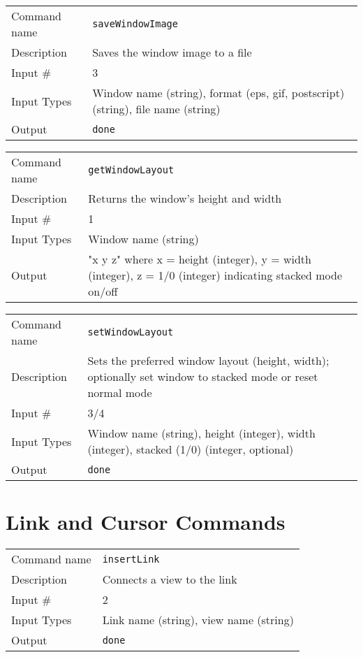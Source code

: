 \bigskip

\noindent
\begin{tabular}{l|p{5in}}
\hline
Command name & {\tt saveWindowImage} \\
Description  & Saves the window image to a file \\
Input \#     & 3 \\
Input Types  & Window name (string), format (eps, gif, postscript) (string),
               file name (string) \\
Output       & {\tt done} \\
\hline
\end{tabular}

\bigskip

\noindent
\begin{tabular}{l|p{5in}}
\hline
Command name & {\tt getWindowLayout} \\
Description  & Returns the window's height and width \\
Input \#     & 1 \\
Input Types  & Window name (string) \\
Output       & "x y z" where x = height (integer), y = width (integer),
               z = 1/0 (integer) indicating stacked mode on/off \\
\hline
\end{tabular}

\bigskip

\noindent
\begin{tabular}{l|p{5in}}
\hline
Command name & {\tt setWindowLayout} \\
Description  & Sets the preferred window layout (height, width); optionally
               set window to stacked mode or reset normal mode \\
Input \#     & 3/4 \\
Input Types  & Window name (string), height (integer), width (integer),
               stacked (1/0) (integer, optional) \\
Output       & {\tt done} \\
\hline
\end{tabular}

\section{Link and Cursor Commands}

\noindent
\begin{tabular}{l|p{5in}}
\hline
Command name & {\tt insertLink} \\
Description  & Connects a view to the link \\
Input \#     & 2 \\
Input Types  & Link name (string), view name (string) \\
Output       & {\tt done} \\
\hline
\end{tabular}

